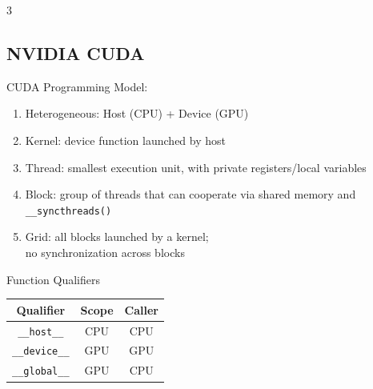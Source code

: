 \documentclass[12pt, a4paper]{article}
\begin{document}
\begin{multicols*}{3}
\subsection{NVIDIA CUDA}
CUDA Programming Model:
\begin{enumerate}[\roman*.]
  \item Heterogeneous: Host (CPU) + Device (GPU)
  \item Kernel: device function launched by host 
  \item Thread: smallest execution unit, with private registers/local variables 
  \item Block: group of threads that can cooperate via shared memory and \lstinline|__syncthreads()|
  \item Grid: all blocks launched by a kernel;\\no synchronization across blocks
\end{enumerate}
\vspace{-1em}
\begin{center}
  Function Qualifiers\\
  \begin{tabular}{|c|c|c|}
  \hline
  \textbf{Qualifier} & \textbf{Scope} & \textbf{Caller} \\
  \hline
  \lstinline|__host__|   & CPU & CPU \\
  \hline
  \lstinline|__device__| & GPU & GPU \\
  \hline
  \lstinline|__global__| & GPU & CPU \\
  \hline
  \end{tabular}
\end{center}


\end{multicols*}
\end{document}
